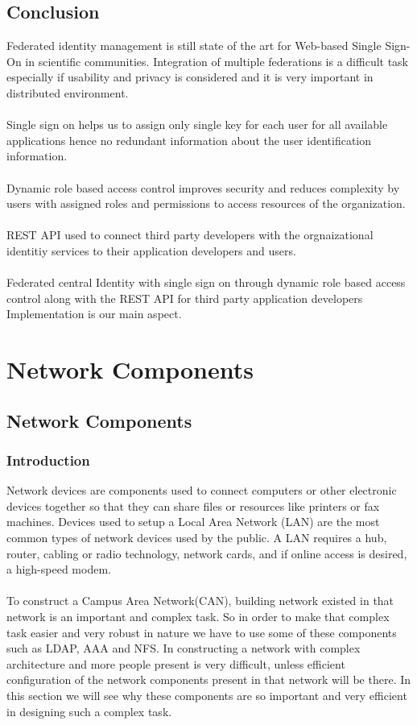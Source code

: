 \documentclass[12pt]{report}
\begin{document}
\section{Conclusion}
Federated identity management is still state of the art for Web-based Single Sign-On in scientific communities. Integration of multiple federations is a difficult task especially if usability and privacy is considered and it is very important in distributed environment. \\
\\
Single sign on helps us to assign only single key for each user for all available applications hence no redundant information about the user identification information.\\
\\
Dynamic role based access control improves security and reduces complexity by users with assigned roles and permissions to access resources of the organization.\\
\\
REST API used to connect third party developers with the orgnaizational identitiy services to their application developers and users.\\
\\
Federated central Identity with single sign on through dynamic role based access control along with the REST API for third party application developers Implementation is our main aspect.

\chapter{Network Components}
\section{Network Components}
	\subsection{Introduction}
\hspace{6mm}Network devices are components used to connect computers or other electronic devices together so that they can share files or resources like printers or fax machines. Devices used to setup a Local Area Network (LAN) are the most common types of network devices used by the public. A LAN requires a hub, router, cabling or radio technology, network cards, and if online access is desired, a high-speed modem. \\
\\
To construct a Campus Area Network(CAN), building network existed in that network is an important and complex task. So in order to make that complex task easier and very robust in nature we have to use some of these components such as LDAP, AAA and NFS. In constructing a network with complex architecture and more people present is very difficult, unless efficient configuration of the network components present in that network will be there. In this section we will see why these components are so important and very efficient in designing such a complex task.
\end{document}
